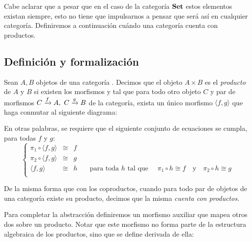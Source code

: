Cabe aclarar que a pesar que en el caso de la categoría $\mathbf{Set}$ estos elementos existan siempre, esto no tiene que impulsarnos a pensar que será así en cualquier categoría. Definiremos a continuación cuándo una categoría cuenta con productos. 


\subsection{Definición y formalización}

\begin{definition}\label{cat:prod}
Sean $A,B$ objetos de una categoría \C. Decimos que el objeto $A\times B$ es el {\it producto} de $A$ y $B$ si existen los morfismos 
 y
tal que para todo otro objeto $C$ y par de morfismos $\flecha{C}{f}{A},\ \flecha{C}{g}{B}$ de la categoría, exista un único morfismo $\langle f,g \rangle$ que haga conmutar al siguiente diagrama:
\begin{center}
  \xymatrixcolsep{3pc} \xymatrixrowsep{3pc}
  \centerline{}
\end{center}

En otras palabras, se requiere que el siguiente conjunto de ecuaciones se cumpla, para todas $f$ y $g$: 
$$
 \left \{ \begin{array}{lclr}
  \pi_1 \circ \langle f, g\rangle & \cong & f &\\ 
  \pi_2 \circ \langle f, g\rangle & \cong & g &\\
  \langle f, g\rangle & \cong & h & \quad \mbox{para toda $h$ tal que } \quad \pi_1 \circ h \cong f \quad \mbox{y}\quad \pi_2 \circ h \cong g\\
 \end{array}
 \right. 
$$
\end{definition}
\vspace{3ex}


De la misma forma que con los coproductos, cuando para todo par de objetos de una categoría existe su producto, decimos que la misma {\it cuenta con productos}.

Para completar la abstracción definiremos un morfismo auxiliar que 
mapea otros dos sobre un producto. Notar que este morfismo no forma parte de la estructura algebraica de los productos, sino que se define derivada de ella:

